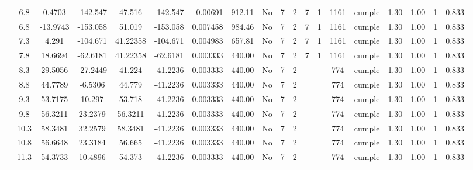 \begin{table}[H]
{\begin{tabular}{|c|c|c|c|c|c|r|c|c|c|c|c|c|c|c|c|c|c|c|}
\cline{2-19}    & \cellcolor[rgb]{ .851,  .882,  .949}6.8 & 0.4703 & -142.547 & 47.516 & -142.547 & 0.00691 & 912.11 & No  & 7   & 2   & 7   & 1   & 1161 & \cellcolor[rgb]{ .776,  .937,  .808}cumple & 1.30 & 1.00 & 1   & 0.833 \bigstrut\\
\cline{2-19}    & \cellcolor[rgb]{ .851,  .882,  .949}6.8 & -13.9743 & -153.058 & 51.019 & -153.058 & 0.007458 & 984.46 & No  & 7   & 2   & 7   & 1   & 1161 & \cellcolor[rgb]{ .776,  .937,  .808}cumple & 1.30 & 1.00 & 1   & 0.833 \bigstrut\\
\cline{2-19}    & 7.3 & 4.291 & -104.671 & 41.22358 & -104.671 & 0.004983 & 657.81 & No  & 7   & 2   & 7   & 1   & 1161 & \cellcolor[rgb]{ .776,  .937,  .808}cumple & 1.30 & 1.00 & 1   & 0.833 \bigstrut\\
\cline{2-19}    & 7.8 & 18.6694 & -62.6181 & 41.22358 & -62.6181 & 0.003333 & 440.00 & No  & 7   & 2   & 7   & 1   & 1161 & \cellcolor[rgb]{ .776,  .937,  .808}cumple & 1.30 & 1.00 & 1   & 0.833 \bigstrut\\
\cline{2-19}    & 8.3 & 29.5056 & -27.2449 & 41.224 & -41.2236 & 0.003333 & 440.00 & No  & 7   & 2   &     &     & 774 & \cellcolor[rgb]{ .776,  .937,  .808}cumple & 1.30 & 1.00 & 1   & 0.833 \bigstrut\\
\cline{2-19}    & 8.8 & 44.7789 & -6.5306 & 44.779 & -41.2236 & 0.003333 & 440.00 & No  & 7   & 2   &     &     & 774 & \cellcolor[rgb]{ .776,  .937,  .808}cumple & 1.30 & 1.00 & 1   & 0.833 \bigstrut\\
\cline{2-19}    & 9.3 & 53.7175 & 10.297 & 53.718 & -41.2236 & 0.003333 & 440.00 & No  & 7   & 2   &     &     & 774 & \cellcolor[rgb]{ .776,  .937,  .808}cumple & 1.30 & 1.00 & 1   & 0.833 \bigstrut\\
\cline{2-19}    & 9.8 & 56.3211 & 23.2379 & 56.3211 & -41.2236 & 0.003333 & 440.00 & No  & 7   & 2   &     &     & 774 & \cellcolor[rgb]{ .776,  .937,  .808}cumple & 1.30 & 1.00 & 1   & 0.833 \bigstrut\\
\cline{2-19}    & 10.3 & 58.3481 & 32.2579 & 58.3481 & -41.2236 & 0.003333 & 440.00 & No  & 7   & 2   &     &     & 774 & \cellcolor[rgb]{ .776,  .937,  .808}cumple & 1.30 & 1.00 & 1   & 0.833 \bigstrut\\
\cline{2-19}    & 10.8 & 56.6648 & 23.3184 & 56.665 & -41.2236 & 0.003333 & 440.00 & No  & 7   & 2   &     &     & 774 & \cellcolor[rgb]{ .776,  .937,  .808}cumple & 1.30 & 1.00 & 1   & 0.833 \bigstrut\\
\cline{2-19}    & 11.3 & 54.3733 & 10.4896 & 54.373 & -41.2236 & 0.003333 & 440.00 & No  & 7   & 2   &     &     & 774 & \cellcolor[rgb]{ .776,  .937,  .808}cumple & 1.30 & 1.00 & 1   & 0.833 \bigstrut\\

\end{tabular}}
\end{table}
